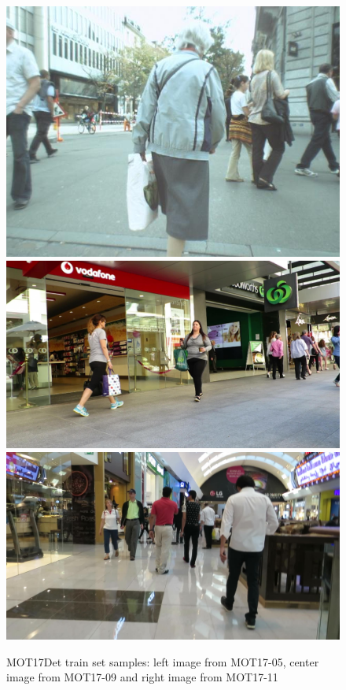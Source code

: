 \begin{figure}[H]
\begin{center}
\includegraphics[scale=0.2]{figures/000334.jpg}
\includegraphics[scale=0.08]{figures/000388.jpg}
\includegraphics[scale=0.08]{figures/000487.jpg}
\caption{MOT17Det train set samples: left image from MOT17-05, center image from MOT17-09 and right image from MOT17-11}
\label{fig:mot_images}
\end{center}
\end{figure}
